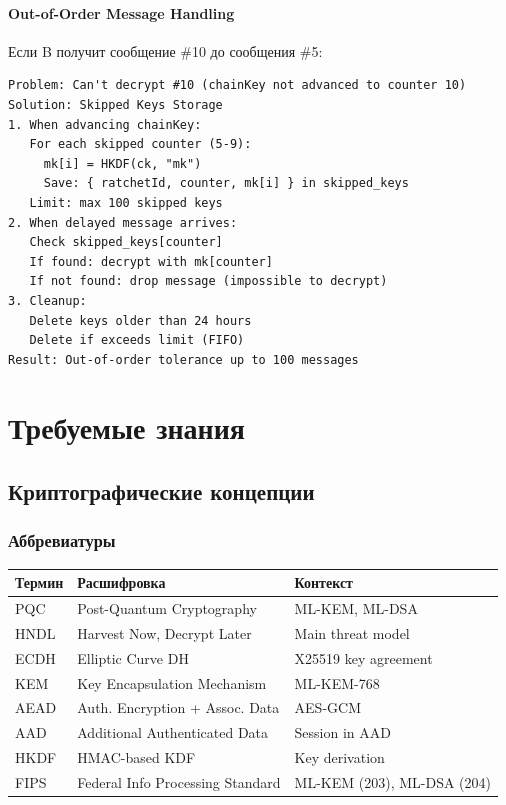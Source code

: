 \documentclass[11pt,a4paper,oneside]{book}
\begin{document}
\vspace{-0.2cm}\subsection{Out-of-Order Message Handling}
Если B получит сообщение \#10 до сообщения \#5:
\begin{verbatim}
Problem: Can't decrypt #10 (chainKey not advanced to counter 10)
Solution: Skipped Keys Storage
1. When advancing chainKey:
   For each skipped counter (5-9):
     mk[i] = HKDF(ck, "mk")
     Save: { ratchetId, counter, mk[i] } in skipped_keys
   Limit: max 100 skipped keys
2. When delayed message arrives:
   Check skipped_keys[counter]
   If found: decrypt with mk[counter]
   If not found: drop message (impossible to decrypt)
3. Cleanup:
   Delete keys older than 24 hours
   Delete if exceeds limit (FIFO)
Result: Out-of-order tolerance up to 100 messages
\end{verbatim}
\vspace{-1cm}\part{Требуемые знания}
\vspace{-0.5cm}\chapter{Криптографические концепции}
\vspace{-0.3cm}\section{Аббревиатуры}
\begin{table}[h]
\centering
\begin{tabular}{|l|l|l|}
\hline
\textbf{Термин} & \textbf{Расшифровка} & \textbf{Контекст} \\
\hline
PQC & Post-Quantum Cryptography & ML-KEM, ML-DSA \\
\hline
HNDL & Harvest Now, Decrypt Later & Main threat model \\
\hline
ECDH & Elliptic Curve DH & X25519 key agreement \\
\hline
KEM & Key Encapsulation Mechanism & ML-KEM-768 \\
\hline
AEAD & Auth. Encryption + Assoc. Data & AES-GCM \\
\hline
AAD & Additional Authenticated Data & Session in AAD \\
\hline
HKDF & HMAC-based KDF & Key derivation \\
\hline
FIPS & Federal Info Processing Standard & ML-KEM (203), ML-DSA (204) \\
\hline
\end{tabular}
\end{table}
\end{document}
